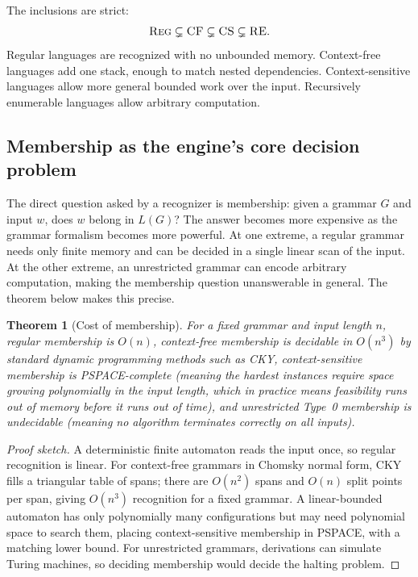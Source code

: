 \documentclass[11pt]{article}
\theoremstyle{definition}
\theoremstyle{plain}
\newtheorem{theorem}{Theorem}[section]
\theoremstyle{remark}
\begin{document}
The inclusions are strict:
\[
  \textsc{Reg} \subsetneq \textsc{CF} \subsetneq \textsc{CS} \subsetneq \textsc{RE}.
\]
Regular languages are recognized with no unbounded memory. Context-free languages add one
stack, enough to match nested dependencies. Context-sensitive languages allow more general
bounded work over the input. Recursively enumerable languages allow arbitrary computation.

\subsection{Membership as the engine's core decision problem}

The direct question asked by a recognizer is membership: given a grammar $G$ and input $w$,
does $w$ belong in $L(G)$? The answer becomes more expensive as the grammar formalism becomes more
powerful. At one extreme, a regular grammar needs only finite memory and can be decided
in a single linear scan of the input. At the other extreme, an unrestricted grammar can
encode arbitrary computation, making the membership question unanswerable in general.
The theorem below makes this precise.

\begin{theorem}[Cost of membership]\label{thm:membership-cost}
For a fixed grammar and input length $n$, regular membership is $O(n)$, context-free
membership is decidable in $O(n^3)$ by standard dynamic programming methods such as CKY,
context-sensitive membership is PSPACE-complete (meaning the hardest instances require
space growing polynomially in the input length, which in practice means feasibility runs
out of memory before it runs out of time), and unrestricted Type~0 membership is
undecidable (meaning no algorithm terminates correctly on all inputs).
\end{theorem}

\begin{proof}[Proof sketch]
A deterministic finite automaton reads the input once, so regular recognition is linear.
For context-free grammars in Chomsky normal form, CKY fills a triangular table of spans;
there are $O(n^2)$ spans and $O(n)$ split points per span, giving $O(n^3)$ recognition for a
fixed grammar. A linear-bounded automaton has only polynomially many configurations but may
need polynomial space to search them, placing context-sensitive membership in PSPACE, with a
matching lower bound. For unrestricted grammars, derivations can simulate Turing machines, so
deciding membership would decide the halting problem.
\end{proof}
\end{document}
